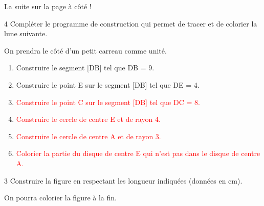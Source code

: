 \documentclass[a4paper]{book}
\begin{document}
{\vfill
\hfill La suite sur la page à côté !

\newpage


    \begin{exerciceNote}{4}
        Compléter le programme de construction qui permet de tracer et de colorier la lune suivante.

        On prendra le côté d'un petit carreau comme unité.
        
        \begin{center}
        \end{center}

        \begin{enumerate}
            \item Construire le segment [DB] tel que DB = 9.
            \item Construire le point E sur le segment [DB] tel que DE = 4.
            \item \textcolor{red}{Construire le point C sur le segment [DB] tel que DC = 8.}
            \item \textcolor{red}{Construire le cercle de centre E et de rayon 4.}
            \item \textcolor{red}{Construire le cercle de centre A et de rayon 3.}
            \item \textcolor{red}{Colorier la partie du disque de centre E qui n'est pas dans le disque de centre A.}
        \end{enumerate}

        \vspace{5cm}
        
    \end{exerciceNote}


    \begin{exerciceNote}{3}
        Construire la figure en respectant les longueur indiquées (données en cm).

        On pourra colorier la figure à la fin.

        \begin{center}
        \end{center}
    \end{exerciceNote}

}
\end{document}
